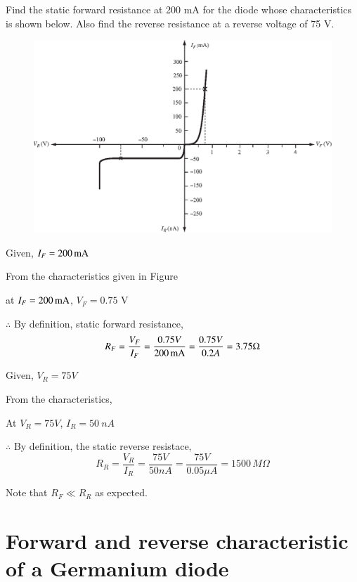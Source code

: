 \begin{example}\label{exam1.2}
Find the static forward resistance at 200 mA for the diode whose
characteristics is shown below. Also find the reverse resistance at a
reverse voltage of 75 V.
\begin{figure}[H]
\centering
\includegraphics{chap1/S3-EE-01-008.eps}
\end{figure}
\end{example}

\begin{solution}
Given, $I_F = 200\operatorname{mA}$

From the characteristics given in Figure 

at $I_F = 200\operatorname{mA}$, $V_F =0.75$ V

$\therefore$ By definition, static forward resistance, 
$$
R_F = \frac{V_F}{I_F} = \frac{0.75 V}{200 \operatorname{mA}} = \frac{0.75 V}{0.2 A} =
3.75 \Omega
$$

Given, $V_R = 75 V$

From the characteristics, 

At $V_R =75V$, $I_R = 50~ nA$

$\therefore$ By definition, the static reverse resistace,
$$
R_R = \frac{V_R}{I_R} = \frac{75 V}{50 nA} = \frac{75 V}{0.05 \mu A} =
1500\, M \Omega
$$

Note that $R_F \ll R_R$ as expected.
\end{solution}


\section{Forward and reverse characteristic of a Germanium diode}\label{sec1.8}

